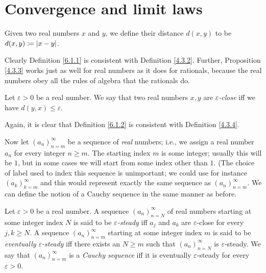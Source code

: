\section{Convergence and limit laws}\label{sec 6.1}

\begin{definition}\label{6.1.1}
    Given two real numbers \(x\) and \(y\), we define their distance \(d(x, y)\) to be \(d(x, y) \coloneqq \abs*{x - y}\).
\end{definition}

\begin{note}
    Clearly Definition \ref{6.1.1} is consistent with Definition \ref{4.3.2}.
    Further, Proposition \ref{4.3.3} works just as well for real numbers as it does for rationals, because the real numbers obey all the rules of algebra that the rationals do.
\end{note}

\begin{definition}\label{6.1.2}
    Let \(\varepsilon > 0\) be a real number.
    We say that two real numbers \(x, y\) are \emph{\(\varepsilon\)-close} iff we have \(d(y, x) \leq \varepsilon\).
\end{definition}

\begin{note}
    Again, it is clear that Definition \ref{6.1.2} is consistent with Definition \ref{4.3.4}.
\end{note}

\begin{note}
    Now let \((a_n)_{n = m}^\infty\) be a sequence of \emph{real} numbers;
    i.e., we assign a real number \(a_n\) for every integer \(n \geq m\).
    The starting index \(m\) is some integer;
    usually this will be \(1\), but in some cases we will start from some index other than \(1\).
    (The choice of label used to index this sequence is unimportant; we could use for instance \((a_k)_{k = m}^{\infty}\) and this would represent exactly the same sequence as \((a_n)_{n = m}^{\infty}\).
    We can define the notion of a Cauchy sequence in the same manner as before.
\end{note}

\begin{definition}\label{6.1.3}
    Let \(\varepsilon > 0\) be a real number.
    A sequence \((a_n)_{n = N}^\infty\) of real numbers starting at some integer index \(N\) is said to be \emph{\(\varepsilon\)-steady} iff \(a_j\) and \(a_k\) are \(\varepsilon\)-close for every \(j, k \geq N\).
    A sequence \((a_n)_{n = m}^\infty\) starting at some integer index \(m\) is said to be \emph{eventually \(\varepsilon\)-steady} iff there exists an \(N \geq m\) such that \((a_n)_{n = N}^\infty\) is \(\varepsilon\)-steady.
    We say that \((a_n)_{n = m}^\infty\) is a \emph{Cauchy sequence} iff it is eventually \(\varepsilon\)-steady for every \(\varepsilon > 0\).
\end{definition}


